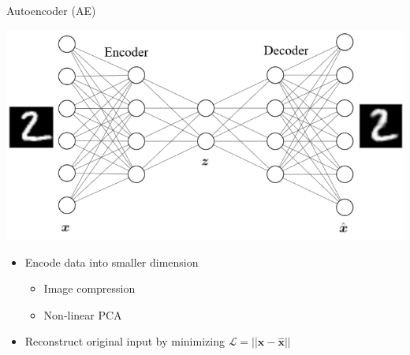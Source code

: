\documentclass{beamer}
\newcommand{\vect}[1]{\boldsymbol{#1}}
\theoremstyle{definition}
\begin{document}
\begin{frame}{Autoencoder (AE)}
  \begin{center}
    \includegraphics[width=.8\textwidth]{../img/ae_visual.png}
  \end{center}
\begin{itemize}
  \item Encode data into smaller dimension
    \begin{itemize}
      \item Image compression
      \item Non-linear PCA
    \end{itemize}
  \item Reconstruct original input by minimizing $\mathcal{L} = ||\vect x - \hat{\vect x}||$
\end{itemize}
\end{frame}
\end{document}
